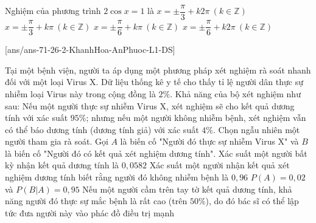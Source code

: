 \begin{ex}%
	Nghiệm của phương trình $2\cos x = 1$ là
	\choice
	{\True $x = \pm\dfrac{\pi}{3} + k2\pi\ (k \in \mathbb{Z})$}
	{$x = \pm\dfrac{\pi}{3} + k\pi\ (k \in \mathbb{Z})$}
	{$x = \pm\dfrac{\pi}{6} + k\pi\ (k \in \mathbb{Z})$}
	{$x = \pm\dfrac{\pi}{6} + k2\pi\ (k \in \mathbb{Z})$}
\end{ex}

\cauds
{}[ans/ans-71-26-2-KhanhHoa-AnPhuoc-L1-DS]
\begin{ex}%
	Tại một bệnh viện, người ta áp dụng một phương pháp xét nghiệm rà soát nhanh đối với một loại Virus X. Dữ liệu thống kê y tế cho thấy tỉ lệ người dân thực sự nhiễm loại Virus này trong cộng đồng là $2\%$. Khả năng của bộ xét nghiệm như sau: Nếu một người thực sự nhiễm Virus X, xét nghiệm sẽ cho kết quả dương tính với xác suất $95\%$; nhưng nếu một người không nhiễm bệnh, xét nghiệm vẫn có thể báo dương tính (dương tính giả) với xác suất $4\%$. Chọn ngẫu nhiên một người tham gia rà soát. Gọi $A$ là biến cố "Người đó thực sự nhiễm Virus X" và $B$ là biến cố "Người đó có kết quả xét nghiệm dương tính".
	\choiceTF
	{\True Xác suất một người bất kỳ nhận kết quả dương tính là $0{,}0582$}
	{Xác suất một người nhận kết quả xét nghiệm dương tính biết rằng người đó không nhiễm bệnh là $0{,}96$}
	{\True $P(A) = 0{,}02$ và $P(B|A) = 0{,}95$}
	{Nếu một người cầm trên tay tờ kết quả dương tính, khả năng người đó thực sự mắc bệnh là rất cao (trên $50\%$), do đó bác sĩ có thể lập tức đưa người này vào phác đồ điều trị mạnh}
\end{ex}

